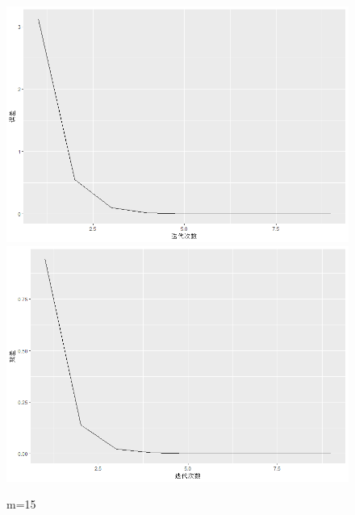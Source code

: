 \documentclass[10pt]{article}
\begin{document}
\begin{enumerate}
\begin{figure}[H]
  \centering
  \includegraphics[width=.8\textwidth]{5-m=151.png}
  \includegraphics[width=.8\textwidth]{5-m=152.png}
  \caption{m=15}
  \end{figure}
  

\end{enumerate}
\end{document}
